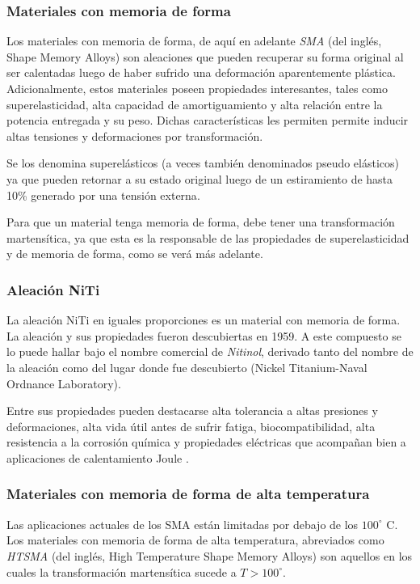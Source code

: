 \documentclass{article}
\theoremstyle{definition}
\theoremstyle{remark}
\begin{document}
\subsubsection{Materiales con memoria de forma}

Los materiales con memoria de forma, de aquí en adelante \textit{SMA} (del inglés, Shape Memory Alloys) son aleaciones que pueden recuperar su forma original al ser calentadas luego de haber sufrido una deformación aparentemente plástica. Adicionalmente, estos materiales poseen propiedades interesantes, tales como superelasticidad, alta capacidad de amortiguamiento y alta relación entre la potencia entregada y su peso. Dichas características les permiten permite inducir altas tensiones y deformaciones por transformación.

Se los denomina superelásticos (a veces también denominados pseudo elásticos) ya que pueden retornar a su estado original luego de un estiramiento de hasta 10\% generado por una tensión externa\cite{Rubber}.

Para que un material tenga memoria de forma, debe tener una transformación martensítica, ya que esta es la responsable de las propiedades de superelasticidad y de memoria de forma, como se verá más adelante.

\subsubsection{Aleación NiTi}\label{aleation}
La aleación NiTi en iguales proporciones es un material con memoria de forma. La aleación y sus propiedades fueron descubiertas en 1959. A este compuesto se lo puede hallar bajo el nombre comercial de \textit{Nitinol}, derivado tanto del nombre de la aleación como del lugar donde fue descubierto (Nickel Titanium-Naval Ordnance Laboratory)\cite{Story}. 

Entre sus propiedades pueden destacarse alta tolerancia a altas presiones y deformaciones, alta vida útil antes de sufrir fatiga, biocompatibilidad, alta resistencia a la corrosión química y propiedades eléctricas que acompañan bien a aplicaciones de calentamiento Joule \cite{ThinFilm}.

\subsubsection{Materiales con memoria de forma de alta temperatura}

Las aplicaciones actuales de los SMA están limitadas por debajo de los $100^\circ$ C. Los materiales con memoria de forma de alta temperatura, abreviados como \textit{HTSMA} (del inglés, High Temperature Shape Memory Alloys) son aquellos en los cuales la transformación martensítica sucede a $T > 100^\circ$.
\end{document}
